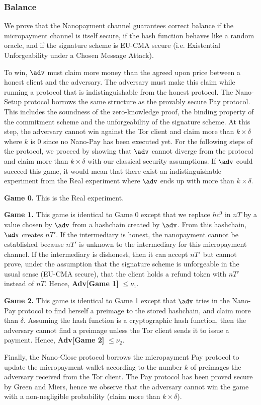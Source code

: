 \subsubsection{Balance}

We prove that the Nanopayment channel guarantees correct balance if the micropayment channel is itself secure, if the hash function behaves like a random oracle, and if the signature scheme is EU-CMA secure (i.e. Existential Unforgeability under a Chosen Message Attack).

To win, $\adv$ must claim more money than the agreed upon price between a honest client and the adversary. The adversary must make this claim while running a protocol that is indistinguishable from the honest protocol. The Nano-Setup protocol borrows the same structure as the provably secure Pay protocol. This includes the soundness of the zero-knowledge proof, the binding property of the commitment scheme and the unforgeability of the signature scheme. At this step, the adversary cannot win against the Tor client and claim more than $k \times \delta$ where $k$ is 0 since no Nano-Pay has been executed yet. For the following steps of the protocol, we proceed by showing that $\adv$ cannot diverge from the protocol and claim more than $k \times \delta$ with our classical security assumptions. If $\adv$ could succeed this game, it would mean that there exist an indistinguishable experiment from the Real experiment where $\adv$ ends up with more than $k \times \delta$.

\textbf{Game 0.} This is the Real experiment.

\textbf{Game 1.} This game is identical to Game 0 except that we replace $hc^0$ in $nT$ by a value chosen by $\adv$ from a hashchain created by $\adv$. From this hashchain, $\adv$ creates $nT'$. If the intermediary is honest, the nanopayment cannot be established because $nT'$ is unknown to the intermediary for this micropayment channel. If the intermediary is dishonest, then it can accept $nT'$ but cannot prove, under the assumption that the signature scheme is unforgeable in the usual sense (EU-CMA secure), that the client holds a refund token with $nT'$ instead of $nT$. Hence, \textbf{Adv[Game 1]} $\leq \nu_1$.

\textbf{Game 2.} This game is identical to Game 1 except that $\adv$ tries in the Nano-Pay protocol to find herself a preimage to the stored hashchain, and claim more than $\delta$. Assuming the hash function is a cryptographic hash function, then the adversary cannot find a preimage unless the Tor client sends it to issue a payment. Hence, \textbf{Adv[Game 2]} $\leq \nu_2$.

Finally, the Nano-Close protocol borrows the micropayment Pay protocol to update the micropayment wallet according to the number $k$ of preimages the adversary received from the Tor client. The Pay protocol has been proved secure by Green and Miers, hence we observe that the adversary cannot win the game with a non-negligible probability (claim more than $k \times \delta$).

